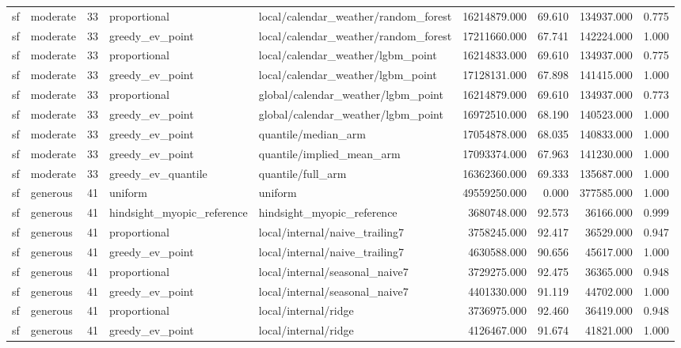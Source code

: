 \begin{tabular}{llrllrrrr}
sf & moderate & 33 & proportional & local/calendar\_weather/random\_forest & 16214879.000 & 69.610 & 134937.000 & 0.775 \\
sf & moderate & 33 & greedy\_ev\_point & local/calendar\_weather/random\_forest & 17211660.000 & 67.741 & 142224.000 & 1.000 \\
sf & moderate & 33 & proportional & local/calendar\_weather/lgbm\_point & 16214833.000 & 69.610 & 134937.000 & 0.775 \\
sf & moderate & 33 & greedy\_ev\_point & local/calendar\_weather/lgbm\_point & 17128131.000 & 67.898 & 141415.000 & 1.000 \\
sf & moderate & 33 & proportional & global/calendar\_weather/lgbm\_point & 16214879.000 & 69.610 & 134937.000 & 0.773 \\
sf & moderate & 33 & greedy\_ev\_point & global/calendar\_weather/lgbm\_point & 16972510.000 & 68.190 & 140523.000 & 1.000 \\
sf & moderate & 33 & greedy\_ev\_point & quantile/median\_arm & 17054878.000 & 68.035 & 140833.000 & 1.000 \\
sf & moderate & 33 & greedy\_ev\_point & quantile/implied\_mean\_arm & 17093374.000 & 67.963 & 141230.000 & 1.000 \\
sf & moderate & 33 & greedy\_ev\_quantile & quantile/full\_arm & 16362360.000 & 69.333 & 135687.000 & 1.000 \\
sf & generous & 41 & uniform & uniform & 49559250.000 & 0.000 & 377585.000 & 1.000 \\
sf & generous & 41 & hindsight\_myopic\_reference & hindsight\_myopic\_reference & 3680748.000 & 92.573 & 36166.000 & 0.999 \\
sf & generous & 41 & proportional & local/internal/naive\_trailing7 & 3758245.000 & 92.417 & 36529.000 & 0.947 \\
sf & generous & 41 & greedy\_ev\_point & local/internal/naive\_trailing7 & 4630588.000 & 90.656 & 45617.000 & 1.000 \\
sf & generous & 41 & proportional & local/internal/seasonal\_naive7 & 3729275.000 & 92.475 & 36365.000 & 0.948 \\
sf & generous & 41 & greedy\_ev\_point & local/internal/seasonal\_naive7 & 4401330.000 & 91.119 & 44702.000 & 1.000 \\
sf & generous & 41 & proportional & local/internal/ridge & 3736975.000 & 92.460 & 36419.000 & 0.948 \\
sf & generous & 41 & greedy\_ev\_point & local/internal/ridge & 4126467.000 & 91.674 & 41821.000 & 1.000 \\

\end{tabular}
